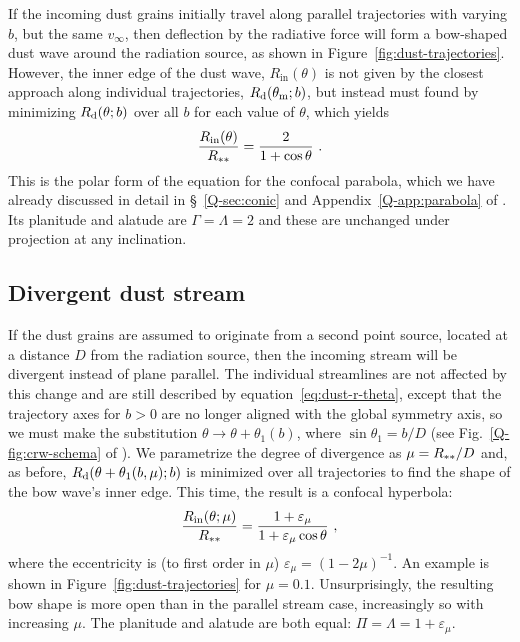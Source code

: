 If the incoming dust grains initially travel along parallel
trajectories with varying \(b\), but the same \(v_\infty\), then deflection
by the radiative force will form a bow-shaped dust wave around the
radiation source, as shown in Figure~\ref{fig:dust-trajectories}.
However, the inner edge of the dust wave, \(R_{\text{in}}(\theta)\) is not
given by the closest approach along individual trajectories,
\(R_{\text{d}}(\theta_{\text{m}}; b)\), but instead must found by minimizing
\(R_{\text{d}}(\theta; b)\) over all \(b\) for each value of \(\theta\), which yields
\begin{equation}
  \label{eq:dust-r-in}
  \frac{R_{\text{in}}(\theta)} {R\starstar} = \frac{2}{1 + \cos\theta} \ .
\end{equation}
This is the polar form of the equation for the confocal parabola,
which we have already discussed in detail in \S~\ref{Q-sec:conic} and
Appendix~\ref{Q-app:parabola} of \citet{Tarango-Yong:2018a}.  Its
planitude and alatude are \(\Gamma = \Lambda = 2\) and these are
unchanged under projection at any inclination.



\subsection{Divergent dust stream}
\label{sec:dust-divergent}

If the dust grains are assumed to originate from a second point
source, located at a distance \(D\) from the radiation source, then
the incoming stream will be divergent instead of plane parallel.  The
individual streamlines are not affected by this change and are still
described by equation~\eqref{eq:dust-r-theta}, except that the
trajectory axes for \(b > 0\) are no longer aligned with the global
symmetry axis, so we must make the substitution
\(\theta \to \theta + \theta_1(b)\), where \(\sin \theta_1 = b / D\) (see
Fig.~\ref{Q-fig:crw-schema} of \PaperI{}). We parametrize the degree
of divergence as \(\mu = R_{**} / D\) and, as before,
\(R_{\text{d}}(\theta + \theta_1(b, \mu); b)\) is minimized over all trajectories to
find the shape of the bow wave's inner edge.  This time, the result is
a confocal hyperbola:
\begin{equation}
  \label{eq:dust-divergent-r-in}
  \frac{R_{\text{in}}(\theta; \mu)} {R_{**}} = \frac{1 + \varepsilon_\mu}{1 + \varepsilon_\mu\cos\theta} \ ,
\end{equation}
where the eccentricity is (to first order in \(\mu\))
\( \varepsilon_\mu = (1 - 2\mu)^{-1}\).  An example is shown in
Figure~\ref{fig:dust-trajectories} for \(\mu = 0.1\).  Unsurprisingly,
the resulting bow shape is more open than in the parallel stream case,
increasingly so with increasing \(\mu\).  The planitude and alatude are
both equal: \(\Pi = \Lambda = 1 + \varepsilon_\mu\).


